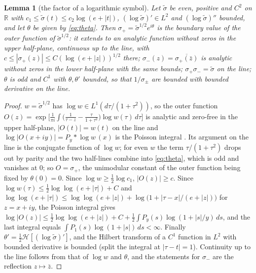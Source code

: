 \documentclass[11pt]{article}
\newtheorem{lemma}[theorem]{Lemma}
\theoremstyle{definition}
\theoremstyle{remark}
\newcommand{\R}{\mathbb{R}}
\begin{document}
\begin{lemma}[the factor of a logarithmic symbol]\label{lem:factor}
Let $\tilde\sigma$ be even, positive and $C^2$ on $\R$ with $c_1\le\tilde\sigma(t)\le c_2\log(e+|t|)$, $(\log\tilde\sigma)'\in L^2$ and $(\log\tilde\sigma)''$ bounded, and let $\theta$ be given by \eqref{eq:theta}. Then $\sigma_+=\tilde\sigma^{1/2}e^{i\theta}$ is the boundary value of the outer function of $\tilde\sigma^{1/2}$: it extends to an analytic function without zeros in the upper half-plane, continuous up to the line, with $c\le|\sigma_+(z)|\le C(\log(e+|z|))^{1/2}$ there; $\sigma_-(z)=\overline{\sigma_+(\bar z)}$ is analytic without zeros in the lower half-plane with the same bounds; $\sigma_+\sigma_-=\tilde\sigma$ on the line; $\theta$ is odd and $C^1$ with $\theta,\theta'$ bounded, so that $1/\sigma_\pm$ are bounded with bounded derivative on the line.
\end{lemma}
\begin{proof}
$w=\tilde\sigma^{1/2}$ has $\log w\in L^1(d\tau/(1+\tau^2))$, so the outer function $O(z)=\exp\big[\frac1{\pi i}\int\big(\frac1{\tau-z}-\frac\tau{1+\tau^2}\big)\log w(\tau)\,d\tau\big]$ is analytic and zero-free in the upper half-plane, $|O(t)|=w(t)$ on the line and $\log|O(x+iy)|=P_y*\log w\,(x)$ is the Poisson integral \cite[Ch.~II]{garnett}. Its argument on the line is the conjugate function of $\log w$; for even $w$ the term $\tau/(1+\tau^2)$ drops out by parity and the two half-lines combine into \eqref{eq:theta}, which is odd and vanishes at $0$; so $O=\sigma_+$, the unimodular constant of the outer function being fixed by $\theta(0)=0$. Since $\log w\ge\frac12\log c_1$, $|O(z)|\ge c$. Since $\log w(\tau)\le\frac12\log\log(e+|\tau|)+C$ and $\log\log(e+|\tau|)\le\log\log(e+|z|)+\log\big(1+|\tau-x|/(e+|z|)\big)$ for $z=x+iy$, the Poisson integral gives $\log|O(z)|\le\frac12\log\log(e+|z|)+C+\frac12\int P_y(s)\log(1+|s|/y)\,ds$, and the last integral equals $\int P_1(s)\log(1+|s|)\,ds<\infty$. Finally $\theta'=\frac12\mathcal H[(\log\tilde\sigma)']$, and the Hilbert transform of a $C^1$ function in $L^2$ with bounded derivative is bounded (split the integral at $|\tau-t|=1$). Continuity up to the line follows from that of $\log w$ and $\theta$, and the statements for $\sigma_-$ are the reflection $z\mapsto\bar z$.
\end{proof}
\end{document}
